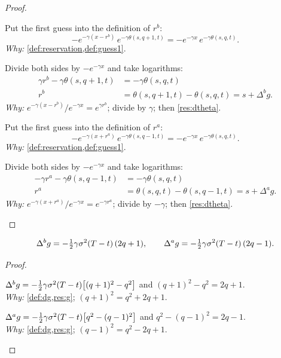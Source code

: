 \begin{proof}
\begin{steps}
  \item Put the first guess into the definition of $r^b$:
  \[
    -e^{-\gamma(x-r^b)}\,e^{-\gamma\theta(s,q+1,t)}=-e^{-\gamma x}\,e^{-\gamma\theta(s,q,t)}.
  \]
  \emph{Why:} \cref{def:reservation,def:guess1}.
  \item Divide both sides by $-e^{-\gamma x}$ and take logarithms:
  \[
    \begin{aligned}
      \gamma r^b-\gamma\theta(s,q+1,t)&=-\gamma\theta(s,q,t)\\
      r^b&=\theta(s,q+1,t)-\theta(s,q,t)=s+\Delta^bg.
    \end{aligned}
  \]
  \emph{Why:} $e^{-\gamma(x-r^b)}/e^{-\gamma x}=e^{\gamma r^b}$; divide by $\gamma$; then \cref{res:dtheta}.
  \item Put the first guess into the definition of $r^a$:
  \[
    -e^{-\gamma(x+r^a)}\,e^{-\gamma\theta(s,q-1,t)}=-e^{-\gamma x}\,e^{-\gamma\theta(s,q,t)}.
  \]
  \emph{Why:} \cref{def:reservation,def:guess1}.
  \item Divide both sides by $-e^{-\gamma x}$ and take logarithms:
  \[
    \begin{aligned}
      -\gamma r^a-\gamma\theta(s,q-1,t)&=-\gamma\theta(s,q,t)\\
      r^a&=\theta(s,q,t)-\theta(s,q-1,t)=s+\Delta^ag.
    \end{aligned}
  \]
  \emph{Why:} $e^{-\gamma(x+r^a)}/e^{-\gamma x}=e^{-\gamma r^a}$; divide by $-\gamma$; then \cref{res:dtheta}.
\end{steps}
\end{proof}

\begin{result}
\label{res:dgvalues}
\[
  \Delta^bg=-\tfrac12\gamma\sigma^2(T-t)\,(2q+1),\qquad
  \Delta^ag=-\tfrac12\gamma\sigma^2(T-t)\,(2q-1).
\]
\end{result}

\begin{proof}
\begin{steps}
  \item $\Delta^bg=-\tfrac12\gamma\sigma^2(T-t)\big[(q+1)^2-q^2\big]$ and $(q+1)^2-q^2=2q+1$.
  \\ \emph{Why:} \cref{def:dg,res:g}; $(q+1)^2=q^2+2q+1$.
  \item $\Delta^ag=-\tfrac12\gamma\sigma^2(T-t)\big[q^2-(q-1)^2\big]$ and $q^2-(q-1)^2=2q-1$.
  \\ \emph{Why:} \cref{def:dg,res:g}; $(q-1)^2=q^2-2q+1$.
\end{steps}
\end{proof}

